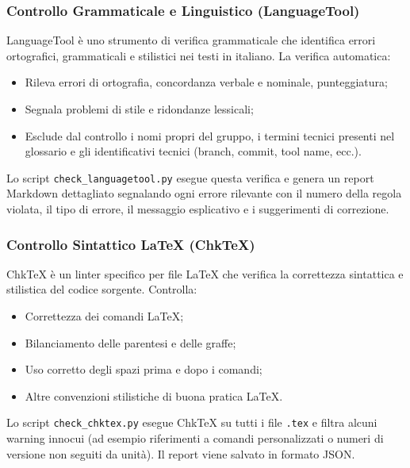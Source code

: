 \documentclass[a4paper,11pt,oneside]{scrartcl}
\begin{document}
\subsubsection{Controllo Grammaticale e Linguistico (LanguageTool)}

LanguageTool è uno strumento di verifica grammaticale che identifica errori ortografici, grammaticali e stilistici nei testi in italiano. La verifica automatica:

\begin{itemize}
    \item Rileva errori di ortografia, concordanza verbale e nominale, punteggiatura;
    \item Segnala problemi di stile e ridondanze lessicali;
    \item Esclude dal controllo i nomi propri del gruppo, i termini tecnici presenti nel glossario e gli identificativi tecnici (branch, commit, tool name, ecc.).
\end{itemize}

Lo script \texttt{check\_languagetool.py} esegue questa verifica e genera un report Markdown dettagliato segnalando ogni errore rilevante con il numero della regola violata, il tipo di errore, il messaggio esplicativo e i suggerimenti di correzione.

\subsubsection{Controllo Sintattico \LaTeX{} (ChkTeX)}

ChkTeX è un linter{\scriptsize{}} specifico per file \LaTeX{} che verifica la correttezza sintattica e stilistica del codice sorgente. Controlla:

\begin{itemize}
    \item Correttezza dei comandi \LaTeX;
    \item Bilanciamento delle parentesi e delle graffe;
    \item Uso corretto degli spazi prima e dopo i comandi;
    \item Altre convenzioni stilistiche di buona pratica \LaTeX.
\end{itemize}

Lo script \texttt{check\_chktex.py} esegue ChkTeX su tutti i file \texttt{.tex} e filtra alcuni warning innocui (ad esempio riferimenti a comandi personalizzati o numeri di versione non seguiti da unità). Il report viene salvato in formato JSON.
\end{document}
